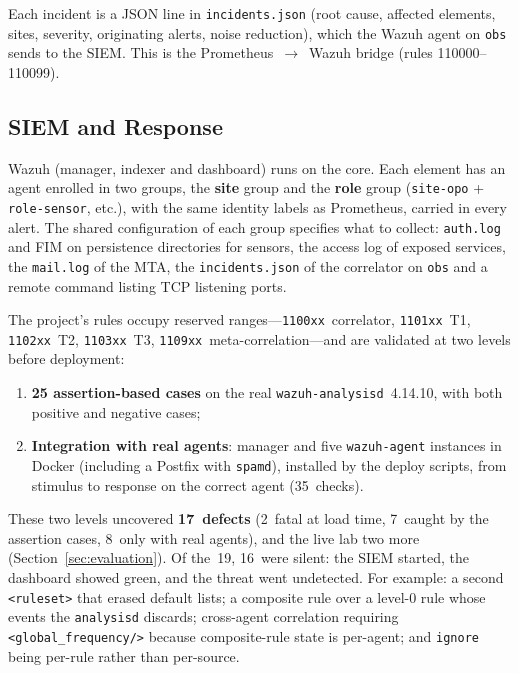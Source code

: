 \documentclass[11pt,a4paper]{article}
\begin{document}
Each incident is a JSON line in \texttt{incidents.json} (root cause, affected elements,
sites, severity, originating alerts, noise reduction), which the Wazuh agent on \texttt{obs}
sends to the SIEM. This is the Prometheus~$\to$~Wazuh bridge (rules 110000--110099).

\subsection{SIEM and Response}

Wazuh (manager, indexer and dashboard) runs on the core. Each element has an agent enrolled
in two groups, the \textbf{site} group and the \textbf{role} group (\texttt{site-opo} +
\texttt{role-sensor}, etc.), with the same identity labels as Prometheus, carried in every
alert. The shared configuration of each group specifies what to collect: \texttt{auth.log}
and FIM on persistence directories for sensors, the access log of exposed services, the
\texttt{mail.log} of the MTA, the \texttt{incidents.json} of the correlator on \texttt{obs}
and a remote command listing TCP listening ports.

The project's rules occupy reserved ranges---\texttt{1100xx}~correlator,
\texttt{1101xx}~T1, \texttt{1102xx}~T2, \texttt{1103xx}~T3,
\texttt{1109xx}~meta-correlation---and are validated at two levels before deployment:

\begin{enumerate}
  \item \textbf{25 assertion-based cases} on the real \texttt{wazuh-analysisd}~4.14.10,
    with both positive and negative cases;
  \item \textbf{Integration with real agents}: manager and five \texttt{wazuh-agent}
    instances in Docker (including a Postfix with \texttt{spamd}), installed by the deploy
    scripts, from stimulus to response on the correct agent (35~checks).
\end{enumerate}

These two levels uncovered \textbf{17~defects} (2~fatal at load time, 7~caught by the
assertion cases, 8~only with real agents), and the live lab two more
(Section~\ref{sec:evaluation}). Of the~19, 16~were silent: the SIEM started,
the dashboard showed green, and the threat went undetected. For example: a second
\texttt{<ruleset>} that erased default lists; a composite rule over a level-0 rule whose
events the \texttt{analysisd} discards; cross-agent correlation requiring
\texttt{<global\_frequency/>} because composite-rule state is per-agent; and \texttt{ignore}
being per-rule rather than per-source.
\end{document}
